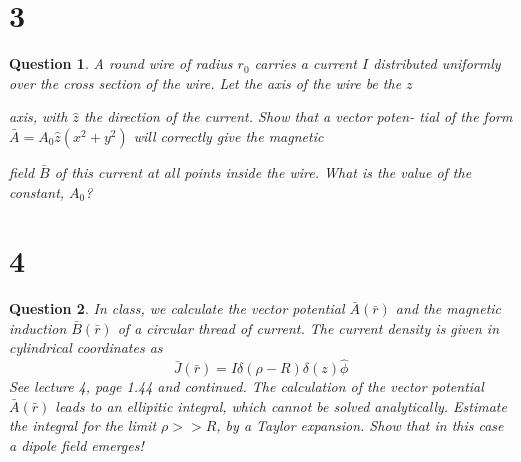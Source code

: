 \documentclass{article}
\newtheorem{question}{Question}
\begin{document}
\break

\section*{3}
\begin{myBox}[]{}
    \begin{question}
        A round wire of radius $r_0$ carries a current $I$ distributed uniformly
        over the cross section of the wire. Let the axis of the wire be the $z$

        axis, with $\hat{z}$ the direction of the current. Show that a vector poten-
        tial of the form $\bar{A}=A_0\hat{z}(x^2+y^2)$ will correctly give the magnetic

        field $\bar{B}$ of this current at all points inside the wire. What is the value
        of the constant, $A_0$?
    \end{question}
\end{myBox}

\break

\section*{4}
\begin{myBox}[]{}
    \begin{question}
        In class, we calculate the vector potential $\bar{A}(\bar{r})$ and the magnetic induction $\bar{B}(\bar{r})$ of a circular
        thread of current. The current density is given in cylindrical coordinates as
        $$\bar{J}(\bar{r})=I\delta(\rho-R)\delta(z)\hat{\phi}$$
        See lecture 4, page 1.44 and continued. The calculation of the vector potential $\bar{A}(\bar{r})$ leads to
        an ellipitic integral, which cannot be solved analytically. Estimate the integral for the limit
        $\rho>> R$, by a Taylor expansion. Show that in this case a dipole field emerges!

    \end{question}
\end{myBox}
\end{document}
